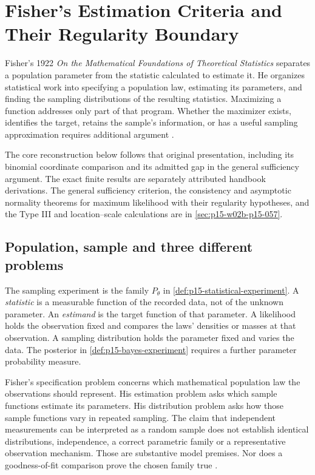 \chapter{Fisher's Estimation Criteria and Their Regularity Boundary}
\label{sec:p15-fisher-estimation}

Fisher's 1922 \emph{On the Mathematical Foundations of Theoretical
Statistics} separates a population parameter from the statistic calculated
to estimate it. He organizes statistical work into specifying a population
law, estimating its parameters, and finding the sampling distributions of
the resulting statistics. Maximizing a function addresses only part of that
program. Whether the maximizer exists, identifies the target, retains the
sample's information, or has a useful sampling approximation requires
additional argument \cite[pp.~309--331]{Fisher1922Foundations}.

The core reconstruction below follows that original presentation, including
its binomial coordinate comparison and its admitted gap in the general
sufficiency argument. The exact finite results are separately attributed
handbook derivations. The general sufficiency criterion, the consistency
and asymptotic normality theorems for maximum likelihood with their
regularity hypotheses, and the Type III and location--scale calculations
are in \cref{sec:p15-w02b-p15-057}.

\section{Population, sample and three different problems}

The sampling experiment is the family \(P_\theta\) in
\cref{def:p15-statistical-experiment}. A \emph{statistic} is a measurable
function of the recorded data, not of the unknown parameter. An
\emph{estimand} is the target function of that parameter. A likelihood
holds the observation fixed and compares the laws' densities or masses
at that observation. A sampling distribution holds the parameter fixed
and varies the data. The posterior in \cref{def:p15-bayes-experiment}
requires a further parameter probability measure.

Fisher's specification problem concerns which mathematical population
law the observations should represent. His estimation problem asks which
sample functions estimate its parameters. His distribution problem asks
how those sample functions vary in repeated sampling. The claim that
independent measurements can be interpreted as a random sample does not
establish identical distributions, independence, a correct parametric
family or a representative observation mechanism. Those are substantive
model premises. Nor does a goodness-of-fit comparison prove the chosen
family true \cite[pp.~311--315]{Fisher1922Foundations}.

